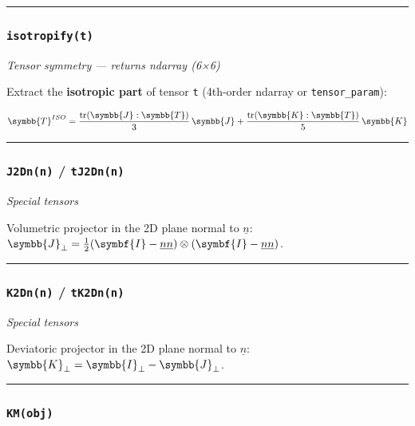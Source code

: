 \documentclass[
  a4paper,
  numbers=noendperiod,
  DIV=12]{scrreprt}
\newcommand{\uu}[1]{{\symbf{{#1}}}}
\newcommand{\uuuu}[1]{{\symbb{{#1}}}}
\newcommand{\uv}[1]{{\underline{{#1}}}}
\DeclareMathOperator{\tr}{tr}
\begin{document}
\begin{center}\rule{0.5\linewidth}{0.5pt}\end{center}

\subsubsection{\texorpdfstring{\texttt{isotropify(t)}}{isotropify(t)}}\label{api-isotropify}

\emph{Tensor symmetry --- returns ndarray (6×6)}

Extract the \textbf{isotropic part} of tensor \texttt{t} (4th-order
ndarray or \texttt{tensor\_param}):

\[\uuuu{T}^{ISO} = \frac{\tr(\uuuu{J}:\uuuu{T})}{3}\,\uuuu{J} +
\frac{\tr(\uuuu{K}:\uuuu{T})}{5}\,\uuuu{K}\]

\begin{center}\rule{0.5\linewidth}{0.5pt}\end{center}

\subsubsection{\texorpdfstring{\texttt{J2Dn(n)} /
\texttt{tJ2Dn(n)}}{J2Dn(n) / tJ2Dn(n)}}\label{api-j2dn}

\emph{Special tensors}

Volumetric projector in the 2D plane normal to \(\uv{n}\):
\(\uuuu{J}_\perp = \frac{1}{2}(\uu{I}-\uv{n}\uv{n})\otimes(\uu{I}-\uv{n}\uv{n})\).

\begin{center}\rule{0.5\linewidth}{0.5pt}\end{center}

\subsubsection{\texorpdfstring{\texttt{K2Dn(n)} /
\texttt{tK2Dn(n)}}{K2Dn(n) / tK2Dn(n)}}\label{api-k2dn}

\emph{Special tensors}

Deviatoric projector in the 2D plane normal to \(\uv{n}\):
\(\uuuu{K}_\perp = \uuuu{I}_\perp - \uuuu{J}_\perp\).

\begin{center}\rule{0.5\linewidth}{0.5pt}\end{center}

\subsubsection{\texorpdfstring{\texttt{KM(obj)}}{KM(obj)}}\label{api-KM}
\end{document}
